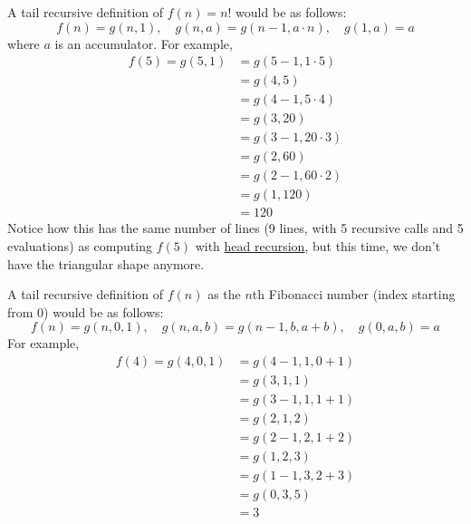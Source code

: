   \begin{example}
    \label{ex:factorials-with-tail-recursion}
    A tail recursive definition of $f(n) = n!$ would be as follows: 
    \begin{equation}
      f(n) = g(n, 1), \quad g(n, a) = g(n - 1, a \cdot n), \quad g(1, a) = a
    \end{equation}
    where $a$ is an accumulator. For example, 
    \begin{align}
      f(5) = g(5, 1) & = g(5 - 1, 1 \cdot 5) \\ 
                     & = g(4, 5) \\ 
                     & = g(4 - 1, 5 \cdot 4) \\ 
                     & = g(3, 20) \\ 
                     & = g(3 - 1, 20 \cdot 3) \\ 
                     & = g(2, 60) \\ 
                     & = g(2 - 1, 60 \cdot 2) \\ 
                     & = g(1, 120) \\ 
                     & = 120
    \end{align}
    Notice how this has the same number of lines (9 lines, with 5 recursive calls and 5 evaluations) as computing $f(5)$ with \hyperref[def:head-recursion]{head recursion}, but this time, we don't have the triangular shape anymore. 
  \end{example}

  \begin{example}
    \label{ex:fibonacci-numbers-with-tail-recursion}
    A tail recursive definition of $f(n)$ as the $n$th Fibonacci number (index starting from $0$) would be as follows: 
    \begin{equation}
      f(n) = g(n, 0, 1), \quad g(n, a, b) = g(n-1, b, a + b), \quad g(0, a, b) = a
    \end{equation} 
    For example, 
    \begin{align}
      f(4) = g(4, 0, 1) & = g(4 - 1, 1, 0 + 1) \\ 
                        & = g(3, 1, 1) \\ 
                        & = g(3 - 1, 1, 1 + 1) \\ 
                        & = g(2, 1, 2) \\ 
                        & = g(2 - 1, 2, 1 + 2) \\ 
                        & = g(1, 2, 3) \\ 
                        & = g(1 - 1, 3, 2 + 3) \\ 
                        & = g(0, 3, 5) \\ 
                        & = 3
    \end{align}
  \end{example}

